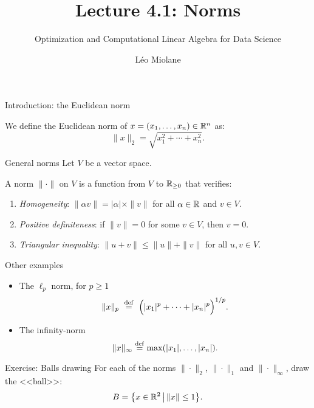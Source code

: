 \documentclass{beamer}
\title{Lecture 4.1: Norms}
\subtitle{Optimization and Computational Linear Algebra for Data Science}
\author{Léo Miolane}
\date{}
\begin{document}
\setcounter{showProgressBar}{0}
\setcounter{showSlideNumbers}{0}

\frame{\titlepage}

\setcounter{framenumber}{0}
\setcounter{showSlideNumbers}{1}

\begin{frame}[t]{Introduction: the Euclidean norm}
	\vspace{-0.4cm}
	\begin{definition}
		We define the Euclidean norm of $x=(x_1, \dots, x_n) \in \mathbb{R}^n$ as:
		$$
		\| x\|_2 = \sqrt{x_1^2 + \cdots + x_n^2}.
		$$
	\end{definition}
	\pause


\end{frame}

\begin{frame}[t]{General norms}
	Let $V$ be a vector space.
	\begin{definition}
		A norm $\| \cdot \|$ on $V$ is a function from $V$ to $\mathbb{R}_{\geq 0}$ that verifies:
		\vspace{0.1cm}
		\begin{enumerate}
			\item \emph{Homogeneity}: $\| \alpha v \| = |\alpha|\times \| v\|$ for all $\alpha \in \mathbb{R}$ and  $v \in V$.
				\vspace{0.1cm}
			\item \emph{Positive definiteness}: if $\|v\| = 0$ for some $v \in V$, then $v=0$.
				\vspace{0.1cm}
			\item \emph{Triangular inequality}: $\|u + v\| \leq \|u\| + \|v\|$ for all $u,v \in V$.
		\end{enumerate}
	\end{definition}
\end{frame}


\begin{frame}{Other examples}
	\begin{itemize}
		\item The $\ell_p$ norm, for $p \geq 1$
			$$\|x\|_p \ \overset{\rm def}{=} \ \Big( |x_1|^p + \cdots + |x_n|^p \Big)^{1/p}.$$
			\vspace{0.3cm}
		\item The infinity-norm 
			$$\|x \|_{\infty} \overset{\rm def}{=} \max(|x_1|, \dots, |x_n|).$$
	\end{itemize}
\end{frame}
\begin{frame}[t]{Exercise: Balls drawing}
	\vspace{-0.2cm}
	For each of the norms $\| \cdot \|_2$, $\| \cdot \|_1$ and $\| \cdot \|_{\infty}$, draw the <<ball>>:
	$$
	B = \big\{ x \in \mathbb{R}^2 \, \big| \, \|x\| \leq 1 \big\}.
	$$
	\pause
	\pause
\end{frame}
\end{document}
